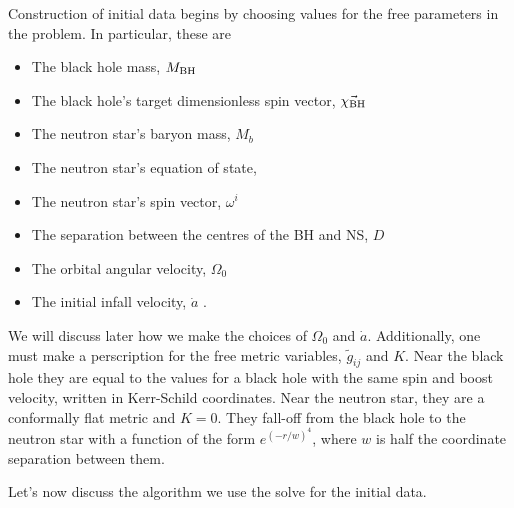 Construction of initial data begins by choosing values for the free parameters in the problem. In particular, these are
\begin{itemize}
\item The black hole mass, $M_{\rm BH}$
\item The black hole's target dimensionless spin vector, $\vec{\chi_{\rm BH}}$
\item The neutron star's baryon mass, $M_{b}$
\item The neutron star's equation of state, 
\item The neutron star's spin vector, $\omega^i$
\item The separation between the centres of the BH and NS, $D$
\item The orbital angular velocity, $\Omega_0$
\item The initial infall velocity, $\dot{a}$
.
\end{itemize}
We will discuss later how we make the choices of $\Omega_0$ and
$\dot{a}$. Additionally, one must make a perscription for the free
metric variables, $\tilde{g}_{ij}$ and $K$. Near the black hole they
are equal to the values for a black hole with the same spin and boost
velocity,
written in Kerr-Schild coordinates. Near the neutron star, they are a
conformally flat metric and $K=0$. They fall-off from the black hole
to the neutron star with a function of the form $e^{(-r/w)^4}$, where
$w$ is half the coordinate separation between them.

Let's now discuss the algorithm we use the solve for the initial data. 

